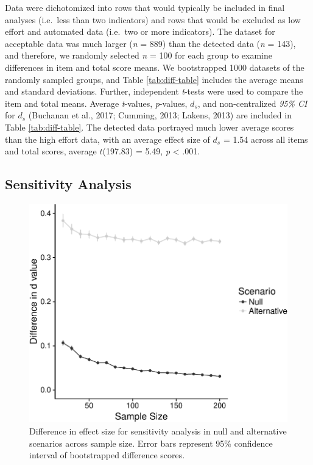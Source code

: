 \documentclass[english,man]{apa6}
\theoremstyle{definition}
\theoremstyle{definition}
\theoremstyle{definition}
\theoremstyle{remark}
\begin{document}
Data were dichotomized into rows that would typically be included in
final analyses (i.e.~less than two indicators) and rows that would be
excluded as low effort and automated data (i.e.~two or more indicators).
The dataset for acceptable data was much larger (\emph{n} = 889) than
the detected data (\emph{n} = 143), and therefore, we randomly selected
\emph{n} = 100 for each group to examine differences in item and total
score means. We bootstrapped 1000 datasets of the randomly sampled
groups, and Table \ref{tab:diff-table} includes the average means and
standard deviations. Further, independent \emph{t}-tests were used to
compare the item and total means. Average \emph{t}-values,
\emph{p}-values, \(d_s\), and non-centralized \emph{95\% CI} for \(d_s\)
(Buchanan et al., 2017; Cumming, 2013; Lakens, 2013) are included in
Table \ref{tab:diff-table}. The detected data portrayed much lower
average scores than the high effort data, with an average effect size of
\(d_s\) = 1.54 across all items and total scores, average \(t\)(197.83)
= 5.49, \emph{p} \textless{} .001.

\subsection{Sensitivity Analysis}\label{sensitivity-analysis}

\begin{figure}
\centering
\includegraphics{SAD_manuscript_files/figure-latex/sense-graph-1.pdf}
\caption{\label{fig:sense-graph}Difference in effect size for sensitivity
analysis in null and alternative scenarios across sample size. Error
bars represent 95\% confidence interval of bootstrapped difference
scores.}
\end{figure}
\end{document}
